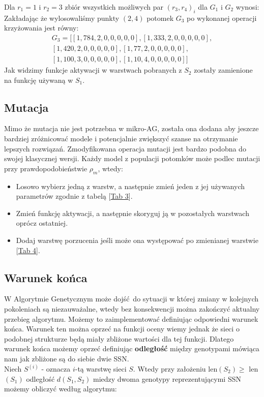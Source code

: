 \documentclass{article}
\begin{document}
Dla $r_1 = 1$ i $r_2 = 3$ zbiór wszystkich możliwych par $(r_3, r_4)_i$ dla $G_1$ i $G_2$ wynosi:
\begin{equation*}
	[(0,2),(0,4),(0,5),(1,2),(1,4),(1,5),(2,4),(2,5),(4,5)]
\end{equation*}
Zakładając że wylosowaliśmy punkty $(2,4)$ potomek $G_3$ po wykonanej operacji krzyżowania
jest równy:
\begin{align*}
	G_3 = \big[[1, 784, 2, 0, 0, 0, 0, 0], [1, 333, 2, 0, 0, 0, 0, 0],\\
	            [1, 420, 2, 0, 0, 0, 0, 0], [1, 77, 2, 0, 0, 0, 0, 0],\\ 
		    [1, 100, 3, 0, 0, 0, 0, 0], [1, 10, 4, 0, 0, 0, 0, 0]\big]
\end{align*}
Jak widzimy funkcje aktywacji w warstwach pobranych z $S_2$ zostały zamienione na funkcję
używaną w $S_1$.\\

\subsection{Mutacja}
Mimo że mutacja nie jest potrzebna w mikro-AG, została ona dodana aby jeszcze bardziej
zróżnicować modele i potencjalnie zwiększyć szanse na otrzymanie lepszych rozwiązań.
Zmodyfikowana operacja mutacji jest bardzo podobna do swojej klasycznej wersji.
Każdy model z populacji potomków może podlec mutacji przy prawdopodobieństwie $\rho_m$, wtedy:
\begin{itemize}
	\item Losowo wybierz jedną z warstw, a następnie zmień jeden z jej używanych parametrów
		zgodnie z tabelą [\hyperref[tab:zakres]{Tab 3}].
	\item Zmień funkcję aktywacji, a następnie skoryguj ją w pozostałych warstwach 
	oprócz ostatniej.
	\item Dodaj warstwę porzucenia jeśli może ona występować po zmienianej warstwie 
	      [\hyperref[tab:rules]{Tab 4}].
\end{itemize}

\subsection{Warunek końca}
W Algorytmie Genetycznym może dojść do sytuacji w której zmiany w kolejnych pokoleniach są
niezauważalne, wtedy bez konsekwencji można zakończyć aktualny przebieg algorytmu. Możemy to
zaimplementować definiując odpowiedni warunek końca. Warunek ten można oprzeć na funkcji oceny
wiemy jednak że sieci o podobnej strukturze będą miały zbliżone wartości dla tej funkcji.
Dlatego warunek końca możemy oprzeć definiując \textbf{odległość} między genotypami mówiąca nam
jak zbliżone są do siebie dwie SSN.\\
Niech $S^{(i)}$ - oznacza $i$-tą warstwę sieci $S$. Wtedy przy założeniu 
len$(S_2) \geq$ len$(S_1)$
odległość $d(S_1, S_2)$ miedzy dwoma genotypy reprezentującymi SSN możemy obliczyć według 
algorytmu:
\end{document}
